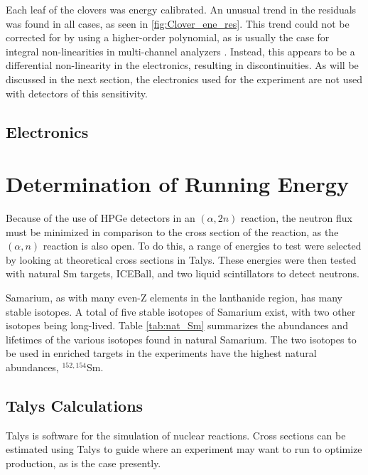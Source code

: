 
Each leaf of the clovers was energy calibrated. An unusual trend in the residuals was found in all cases, as seen in \ref{fig:Clover_ene_res}. This trend could not be corrected for by using a higher-order polynomial, as is usually the case for integral non-linearities in multi-channel analyzers \citep{knoll00:rad_det_meas}. Instead, this appears to be a differential non-linearity in the electronics, resulting in discontinuities. As will be discussed in the next section, the electronics used for the experiment are not used with detectors of this sensitivity.

\subsection{Electronics}


\section{Determination of Running Energy}

Because of the use of HPGe detectors in an $(\alpha,2n)$ reaction, the neutron flux must be minimized in comparison to the cross section of the reaction, as the $(\alpha,n)$ reaction is also open. To do this, a range of energies to test were selected by looking at theoretical cross sections in Talys. These energies were then tested with natural Sm targets, ICEBall, and two liquid scintillators to detect neutrons.

Samarium, as with many even-Z elements in the lanthanide region, has many stable isotopes. A total of five stable isotopes of Samarium exist, with two other isotopes being long-lived. Table \ref{tab:nat_Sm} summarizes the abundances and lifetimes of the various isotopes found in natural Samarium. The two isotopes to be used in enriched targets in the experiments have the highest natural abundances, $^{152,154}$Sm.



\subsection{Talys Calculations}

Talys \citep{koning07:_talys} is software for the simulation of nuclear reactions. Cross sections can be estimated using Talys to guide where an experiment may want to run to optimize production, as is the case presently. 

